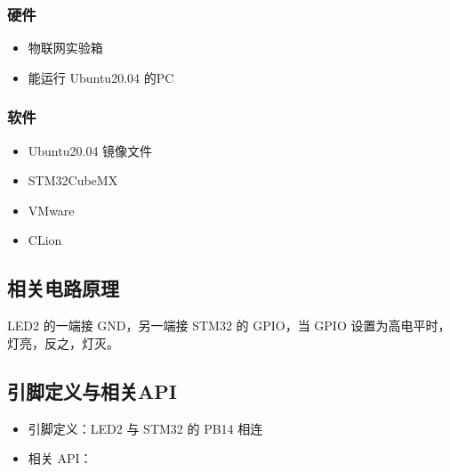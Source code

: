 \documentclass[a4paper,12pt,english]{sphinxmanual}
\begin{document}
\subsubsection{硬件}
\label{\detokenize{exp-stm32/ide-setup:id3}}\begin{itemize}
\item {} 
\sphinxAtStartPar
物联网实验箱

\item {} 
\sphinxAtStartPar
能运行 Ubuntu20.04 的PC

\end{itemize}


\subsubsection{软件}
\label{\detokenize{exp-stm32/ide-setup:id4}}\begin{itemize}
\item {} 
\sphinxAtStartPar
Ubuntu20.04 镜像文件

\item {} 
\sphinxAtStartPar
STM32CubeMX

\item {} 
\sphinxAtStartPar
VMware

\item {} 
\sphinxAtStartPar
CLion

\end{itemize}


\subsection{相关电路原理}
\label{\detokenize{exp-stm32/ide-setup:id5}}
\sphinxAtStartPar
LED2 的一端接 GND，另一端接 STM32 的 GPIO，当 GPIO 设置为高电平时，灯亮，反之，灯灭。

\sphinxAtStartPar
{}

\sphinxAtStartPar
{}


\subsection{引脚定义与相关API}
\label{\detokenize{exp-stm32/ide-setup:api}}\begin{itemize}
\item {} 
\sphinxAtStartPar
引脚定义：LED2 与 STM32 的 PB14 相连

\item {} 
\sphinxAtStartPar
相关 API：

\end{itemize}
\end{document}
